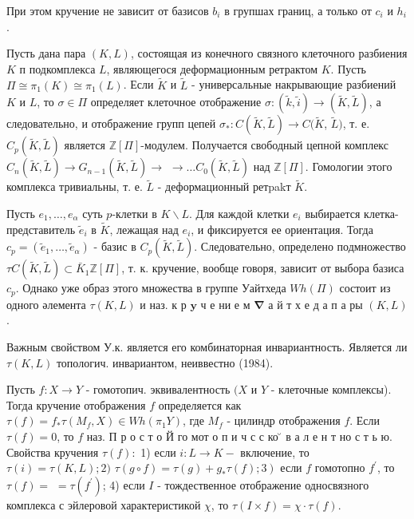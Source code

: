\documentclass[10pt]{article}
\begin{document}
При этом кручение не зависит от базисов $b_{i}$ в групшах границ, а только от $c_{i}$ и $h_{i}$.



Пусть дана пара $(K, L)$, состоящая из конечного связного клеточного разбиения $K$ п подкомплекса $L$, являющегося деформационным ретрактом $K$. Пусть $\Pi \cong \pi_{1}(K) \cong \pi_{1}(L)$. Если $\tilde{K}$ и $\tilde{L}$ - универсальные накрывающие разбиений $K$ и $L$, то $\sigma \in \Pi$ определяет клеточное отображение $\sigma:(\tilde{k}, \tilde{i}) \rightarrow(\tilde{K}, \tilde{L})$, а следовательно, и отображение групп цепей $\sigma_{*}: C(\tilde{K}, \tilde{L}) \rightarrow C(\tilde{K}$, $\tilde{L})$, т. е. $C_{p}(\tilde{K}, \tilde{L})$ является $\mathbb{Z}[\Pi]$-модулем. Получается свободный цепной комплекс $C_{n}(\tilde{K}, \tilde{L}) \rightarrow G_{n-1}(\tilde{K}, \tilde{L}) \rightarrow$ $\rightarrow \ldots C_{0}(\tilde{K}, \tilde{L})$ над $\mathbb{Z}[\Pi]$. Гомологии этого комплекса тривиальны, т. е. $\tilde{L}$ - деформационный ретpakт $\tilde{K}$.



Пусть $e_{1}, \ldots, e_{\alpha}$ суть $p$-клетки в $K \backslash L$. Для каждой клетки $e_{i}$ выбирается клетка-представитель $\tilde{e}_{i}$ в $\tilde{K}$, лежащая над $e_{i}$, и фиксируется ее ориентация. Тогда $c_{p}=\left(\tilde{e}_{1}, \ldots, \tilde{e}_{\alpha}\right)$ - базис в $C_{p}(\tilde{K}, \tilde{L})$. Следовательно, определено подмножество $\tau C(\tilde{K}, \tilde{L}) \subset \bar{K}_{1} \mathbb{Z}[\Pi]$, т. к. кручение, вообще говоря, зависит от выбора базиса $c_{p}$. Однако уже образ этого множества в группе Уайтхеда $W h(\Pi)$ состоит из одного әлемента $\tau(K, L)$ и наз. к р $\mathbf{y}$ ч е ни е м $\boldsymbol{\nabla}$ а й т х е д а п а ры $(K, L)$.



Важным свойством У.к. является его комбинаторная инвариантность. Является ли $\tau(K, L)$ топологич. инвариантом, неиввестно (1984).



Пусть $f: X \rightarrow Y$ - гомотопич. эквивалентность $(X$ и $Y$ - клеточные комплексы). Тогда кручение отображения $f$ определяется как $\tau(f)=f_{*} \tau\left(M_{f}, X\right) \in W h\left(\pi_{1} Y\right)$, где $M_{f}$ - цилиндр отображения $f$. Если $\tau(f)=0$, то $f$ наз. П р о с т о Й го мот о п и ч с с ко ̆ в а л е н т но с т ь ю. Свойства кручения $\tau(f):$ 1) если $i: L \rightarrow K-$ включение, то $\tau(i)=\tau(K, L) ; 2)$ $\left.\tau(g \circ f)=\tau(g)+g_{*} \tau(f) ; 3\right)$ если $f$ гомотопно $f^{\prime}$, то $\tau(f)=$ $=\tau\left(f^{\prime}\right)$; 4) если $I$ - тождественное отображение односвязного комплекса с эйлеровой характеристикой $\chi$, то $\tau(I \times f)=\chi \cdot \tau(f)$.
\end{document}
